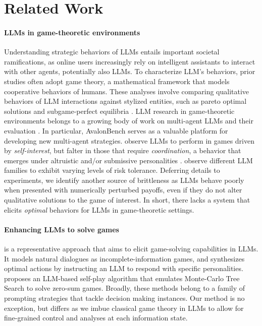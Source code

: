 \section{Related Work}
\label{sec:related}
\paragraph{LLMs in game-theoretic environments} Understanding strategic behaviors of LLMs entails important societal ramifications, as online users increasingly rely on intelligent assistants to interact with other agents, potentially also LLMs. To characterize LLM's behaviors, prior studies \citep{gemp2024states,sreedhar2024simulating,de2023emergent,wu2024shall,akata2023playing,fan2024can,mao2023alympics,guo2023gpt} often adopt game theory, a mathematical framework that models cooperative behaviors of humans. These analyses involve comparing qualitative behaviors of LLM interactions against stylized entities, such as pareto optimal solutions and subgame-perfect equilibria \citep{fudenberg1991game}. LLM research in game-theoretic environments belongs to a growing body of work on multi-agent LLMs \citep{li2023theory} and their evaluation \citep{huang2024far, duan2024gtbench}. In particular, AvalonBench \citep{wang2023avalon} serves as a valuable platform for developing new multi-agent strategies. \citep{guo2023gpt,park2024ai} observe LLMs to perform in games driven by \textit{self-interest}, but falter in those that require \textit{coordination}, a behavior that emerges under altruistic and/or submissive personalities \citep{akata2023playing,guo2023gpt}. \citep{lore2023strategic,coda2024cogbench} observe different LLM families to exhibit varying levels of risk tolerance. Deferring details to experiments, we identify another source of brittleness as LLMs behave poorly when presented with numerically perturbed payoffs, even if they do not alter qualitative solutions to the game of interest. In short, there lacks a system that elicits \textit{optimal} behaviors for LLMs in game-theoretic settings.

\paragraph{Enhancing LLMs to solve games} \citep{gemp2024states} is a representative approach that aims to elicit game-solving capabilities in LLMs. It models natural dialogues as incomplete-information games, and synthesizes optimal actions by instructing an LLM to respond with specific personalities. \citep{guo2024can} proposes an LLM-based self-play algorithm that emulates Monte-Carlo Tree Search to solve zero-sum games. Broadly, these methods belong to a family of prompting strategies \cite{wei2022chain,yao2023tree,liu2024dellma} that tackle decision making instances. Our method is no exception, but differs as we imbue classical game theory in LLMs to allow for fine-grained control and analyses at each information state.


